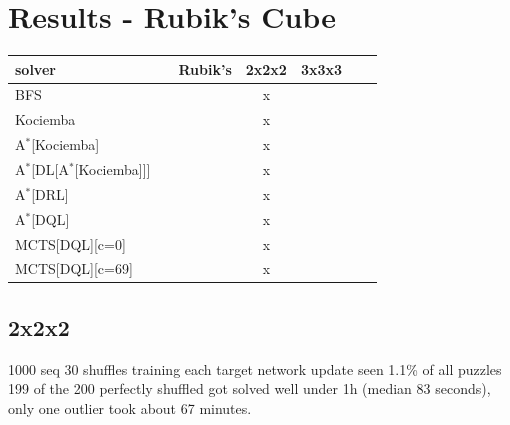 
\chapter{Results - Rubik's Cube} %

\label{Chapter5} %






\begin{center}
\begin{tabular}{l*{5}{c}r}
\hline
\textbf{solver}      & & \textbf{Rubik's} & \textbf{2x2x2} & \textbf{3x3x3} \\
\hline
BFS   &   &        & x   &   \\
\hline
Kociemba   &   &      & x  &   \\
\hline
A$^{*}$[Kociemba]  &   &  & x & \\
\hline
A$^{*}$[DL[A$^{*}$[Kociemba]]]  &   &  & x & \\
\hline
A$^{*}$[DRL]  &   &  & x &  \\
\hline
A$^{*}$[DQL]  &   &  & x &  \\
\hline
MCTS[DQL][c=0]  &   &  & x &  \\
\hline
MCTS[DQL][c=69]  &   & & x &  \\
\hline
\end{tabular}
\end{center}








\section{2x2x2}

1000 seq 30 shuffles training each target network update seen 1.1\% of all puzzles
199 of the 200 perfectly shuffled got solved well under 1h (median 83 seconds), only one outlier took about 67 minutes.


